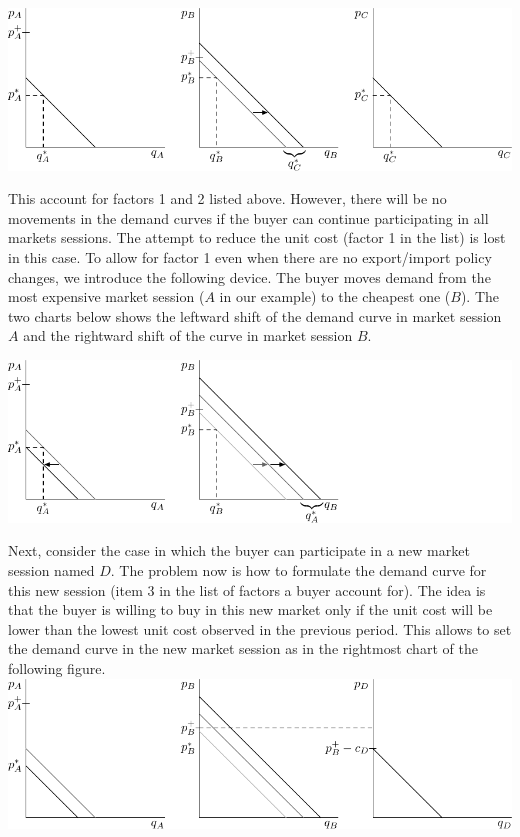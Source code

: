 \documentclass{article}
\begin{document}
\vskip5mm
\hskip-1.5cm
\includegraphics{fig_buying_strategy-1.pdf}

\vskip5mm
 This account for factors 1 and 2 listed above. 
However, there will be no movements in the demand curves if the buyer can continue participating in all markets sessions. The attempt to reduce the unit cost (factor 1 in the list) is lost in this case. To allow for factor 1 even when there are no export/import policy changes, we introduce the following device. The buyer moves demand from the most expensive market session ($A$ in our example) to the cheapest one ($B$). The two charts below shows the leftward shift of the demand curve in market session $A$ and the rightward shift of the curve in market session $B$.     

\vskip5mm
\hskip-1.5cm
\includegraphics{fig_buying_strategy-2.pdf}
\vskip5mm

Next, consider the case in which the buyer can participate in a new market session named $D$. The problem now is how to formulate the demand curve for this new session (item 3 in the list of factors a buyer account for). The idea is that the buyer is willing to buy in this new market only if the unit cost will be lower than the lowest unit cost observed in the previous period. This allows to set the demand curve in the new market session as in the rightmost chart of the following figure. 
\vskip5mm
\hskip-1.5cm
\includegraphics{fig_buying_strategy-3.pdf}
\end{document}
